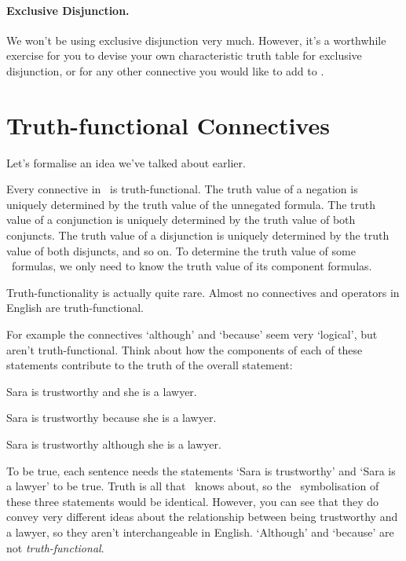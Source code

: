 \documentclass[PHIL101-Textbook.tex]{subfiles}
\begin{document}
\paragraph{Exclusive Disjunction.} We won't be using exclusive disjunction very much. However, it's a worthwhile exercise for you to devise your own characteristic truth table for exclusive disjunction, or for any other connective you would like to add to \tfl.


\section{Truth-functional Connectives}
\label{s:TruthFunctionality}

Let's formalise an idea we've talked about earlier. 
        
Every connective in \tfl\ is truth-functional. The truth value of a negation is uniquely determined by the truth value of the unnegated formula. The truth value of a conjunction is uniquely determined by the truth value of both conjuncts. The truth value of a disjunction is uniquely determined by the truth value of both disjuncts, and so on. To determine the truth value of some \tfl\ formulas, we only need to know the truth value of its component formulas. 


Truth-functionality is actually quite rare. Almost no connectives and operators in English are truth-functional.

For example the connectives `although' and `because' seem very `logical', but aren't truth-functional. Think about how the components of each of these statements contribute to the truth of the overall statement:

	\begin{earg}
  \item Sara is trustworthy and she is a lawyer.
  \item Sara is trustworthy because she is a lawyer.
  \item Sara is trustworthy although she is a lawyer.
	\end{earg}

To be true, each sentence needs the statements `Sara is trustworthy' and `Sara is a lawyer' to be true. Truth is all that \tfl\ knows about, so the \tfl\ symbolisation of these three statements would be identical. However, you can see that they do convey very different ideas about the relationship between being trustworthy and a lawyer, so they aren't interchangeable in English. `Although' and `because' are not \emph{truth-functional}.\\
\end{document}
